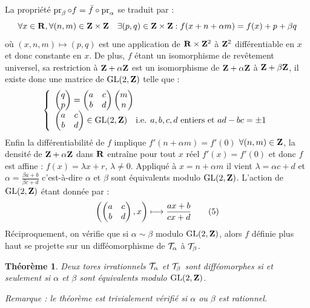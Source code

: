 \documentclass[10pt]{amsart}
\renewcommand{\Torus}{\cT}
\begin{document}
  La propriété $\Proj_{\beta} \circ f = \bar{f} \circ \Proj_{\alpha}$ se traduit par :
  $$
    \forall x \in {\mathbf{R}}, \forall (n, m) \in {\mathbf{Z}} \times {\mathbf{Z}} \quad \exists(p, q) \in {\mathbf{Z}} \times {\mathbf{Z}} : f(x + n + \alpha m) = f(x) + p + \beta q
    $$
  où $(x, n, m) \longmapsto (p, q)$ est une application de ${\mathbf{R}} \times {\mathbf{Z}}^{2}$ à ${\mathbf{Z}}^{2}$ différentiable en $x$ et donc constante en $x$.
  De plus,
  $f$ étant un isomorphisme de revêtement universel,
  sa restriction à ${\mathbf{Z}} + \alpha {\mathbf{Z}}$ est un isomorphisme de ${\mathbf{Z}} + \alpha {\mathbf{Z}}$ à ${\mathbf{Z}} + \beta {\mathbf{Z}}$,
  il existe donc une matrice de $\mathrm{GL}(2, {\mathbf{Z}})$ telle que :
  $$
    \left\{
    \begin{array}{l}
    \begin{pmatrix} q \\ p \end{pmatrix} = \begin{pmatrix}  a & c \\ b & d  \end{pmatrix} \begin{pmatrix} m \\ n \end{pmatrix} \\
    \begin{pmatrix}  a & c \\ b & d  \end{pmatrix} \in \mathrm{GL}(2, {\mathbf{Z}}) \quad \text{i.e. } a, b, c, d \text{ entiers et } ad - bc = \pm 1
    \end{array}
    \right.
    $$
  Enfin la différentiabilité de $f$ implique $f'(n + \alpha m) = f'(0)$ $\forall (n, m) \in {\mathbf{Z}}$,
  la densité de ${\mathbf{Z}} + \alpha {\mathbf{Z}}$ dans ${\mathbf{R}}$ entraîne pour tout $x$ réel $f'(x) = f'(0)$ et donc $f$ est affine : $f(x) = \lambda x + r$,
  $\lambda \neq 0$.
  Appliqué à $x = n + \alpha m$ il vient $\lambda = \alpha c + d$ et $\alpha = \frac{\beta a + b}{\beta c + d}$ c'est-à-dire $\alpha$ et $\beta$ sont équivalents modulo $\mathrm{GL}(2, {\mathbf{Z}})$.
  L'action de $\mathrm{GL}(2, {\mathbf{Z}})$ étant donnée par :
  \begin{equation}
    \left( \begin{pmatrix}  a & c \\ b & d  \end{pmatrix}, x \right) \longmapsto \frac{a x + b}{c x + d} \tag{5}
  \end{equation}
  Réciproquement,
  on vérifie que si $\alpha \sim \beta$ modulo $\mathrm{GL}(2, {\mathbf{Z}})$,
  alors $f$ définie plus haut se projette sur un difféomorphisme de $\Torus_{\alpha}$ à $\Torus_{\beta}$.
  
  \newtheorem*{theoreme}{Théorème}
  \begin{theoreme}
    Deux tores irrationnels $\Torus_{\alpha}$ et $\Torus_{\beta}$ sont difféomorphes si et seulement si $\alpha$ et $\beta$ sont équivalents modulo $\mathrm{GL}(2, {\mathbf{Z}})$.
  \end{theoreme}
  \textit{Remarque : le théorème est trivialement vérifié si $\alpha$ ou $\beta$ est rationnel.}
  
\end{document}
